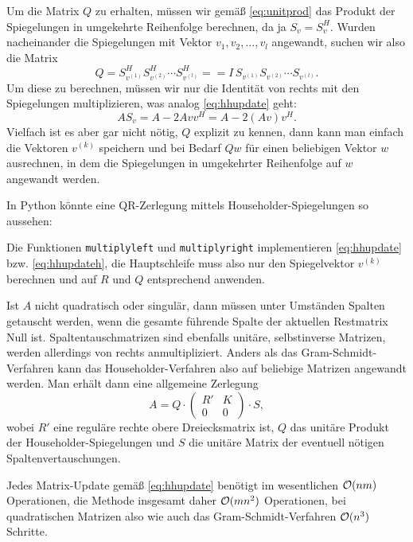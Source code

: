 Um die Matrix $Q$ zu erhalten, müssen wir gemäß \eqref{eq:unitprod}
das Produkt der Spiegelungen in umgekehrte Reihenfolge berechnen, da
ja $S_v = S_v^H$. Wurden nacheinander die Spiegelungen mit Vektor
$v_1, v_2,\ldots,v_{l}$ angewandt, suchen wir also die Matrix
\begin{equation}
  Q = S_{v^{(1)}}^HS_{v^{(2)}}^H\cdots S_{v^{(l)}}^H =
  = I\,S_{v^{(1)}}S_{v^{(2)}}\cdots S_{v^{(l)}}.
\end{equation}
Um diese zu berechnen, müssen wir nur die Identität von rechts mit den
Spiegelungen multiplizieren, was analog \eqref{eq:hhupdate} geht:
\begin{equation}
  \label{eq:hhupdateh}
  AS_v  = A - 2Av v^H = A - 2(Av) v^H.
\end{equation}
Vielfach ist es aber gar nicht nötig, $Q$ explizit zu kennen, dann
kann man einfach die Vektoren $v^{(k)}$ speichern und bei Bedarf $Qw$
für einen beliebigen Vektor $w$ ausrechnen, in dem die Spiegelungen in
umgekehrter Reihenfolge auf $w$ angewandt werden.

In Python könnte eine QR-Zerlegung mittels Householder-Spiegelungen
so aussehen:

Die Funktionen \lstinline!multiplyleft! und \lstinline!multiplyright!
implementieren \eqref{eq:hhupdate} bzw. \eqref{eq:hhupdateh}, die
Hauptschleife muss also nur den Spiegelvektor $v^{(k)}$ berechnen und
auf $R$ und $Q$ entsprechend anwenden.

Ist $A$ nicht quadratisch oder singulär, dann müssen unter Umständen
Spalten getauscht werden, wenn die gesamte führende Spalte der
aktuellen Restmatrix Null ist. Spaltentauschmatrizen sind ebenfalls
unitäre, selbstinverse Matrizen, werden allerdings von rechts
anmultipliziert. Anders als das Gram-Schmidt-Verfahren kann das
Householder-Verfahren also auf beliebige Matrizen angewandt
werden. Man erhält dann eine allgemeine Zerlegung
\begin{equation}
  A = Q \cdot \begin{pmatrix}
    R' & K \\
    0 & 0
  \end{pmatrix} \cdot S,
\end{equation}
wobei $R'$ eine reguläre rechte obere Dreiecksmatrix ist, $Q$ das
unitäre Produkt der Householder-Spiegelungen und $S$ die unitäre
Matrix der eventuell nötigen Spaltenvertauschungen.

Jedes Matrix-Update gemäß \eqref{eq:hhupdate} benötigt im wesentlichen
$\mathcal O(nm)$ Operationen, die Methode insgesamt daher $\mathcal O(mn^2)$
Operationen, bei quadratischen Matrizen also wie auch das
Gram-Schmidt-Verfahren $\mathcal O(n^3)$ Schritte.

